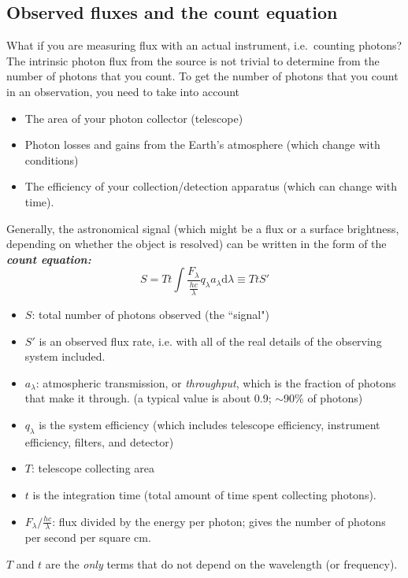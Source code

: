 \documentclass[12pt]{article}
\begin{document}

\subsection*{Observed fluxes and the count equation}
What if you are measuring flux with an actual instrument, i.e.\
counting photons? The intrinsic photon flux from the source is not
trivial to determine from the number of photons that you count. To get
the number of photons that you count in an observation, you need to
take into account
\begin{itemize}
    \item The area of your photon collector (telescope)
    \item Photon losses and gains from the Earth's atmosphere
    (which change with conditions)
    \item The efficiency of your collection/detection
    apparatus (which can change with time).
\end{itemize}
Generally, the astronomical signal (which might be a flux or a
surface brightness, depending on whether the object is resolved)
can be written in the form of the \emph{\textbf{count equation:}}
    $$ S = Tt \int \frac{F_{\lambda}}{\frac{hc}{\lambda}}q_{\lambda}
    a_{\lambda}\textrm{d}\lambda \equiv TtS' $$
    \begin{itemize}
        \item $S$: total number of photons observed (the ``signal")
        \item $S'$ is an observed flux rate,
        i.e. with all of the real details of the observing system included.
        \item $a_{\lambda}$: atmospheric transmission,
        or \emph{throughput}, which is the fraction of photons that
        make it through.
        (a typical value is about 0.9; $\sim$90\% of photons)
        \item $q_{\lambda}$ is the system efficiency
        (which includes telescope efficiency, instrument efficiency,
        filters, and detector)
        \item $T$: telescope collecting area
        \item $t$ is the integration time
        (total amount of time spent collecting photons).
        \item $F_{\lambda}/\frac{hc}{\lambda}$:
        flux divided by the energy per photon;
        gives the number of photons per second per square cm.
    \end{itemize}
$T$ and $t$ are the \emph{only} terms that do not depend on
the wavelength (or frequency).
\end{document}

